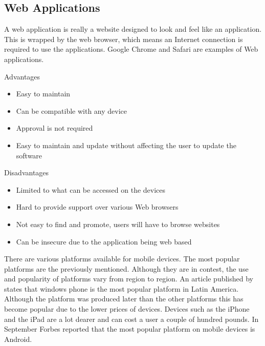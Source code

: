 \subsection{Web Applications}

A web application is really a website designed to look and feel like an 
application. This is wrapped by the web browser, which means an Internet
connection is required to use the applications. Google Chrome and Safari are 
examples of Web applications.

Advantages

\begin{itemize}
  \item Easy to maintain
  \item Can be compatible with any device
  \item Approval is not required
  \item Easy to maintain and update without affecting the user to update the
  software
\end{itemize}

Disadvantages

\begin{itemize}
  \item Limited to what can be accessed on the devices
  \item Hard to provide support over various Web browsers
  \item Not easy to find and promote, users will have to browse websites
  \item Can be insecure due to the application being web based
\end{itemize}

There are various platforms available for mobile devices. The most popular
platforms are the previously mentioned. Although they are in contest, the use
and popularity of platforms vary from region to region. An article published by
\citet{wpcentral13} states that windows phone is the most popular platform in
Latin America. Although the platform was produced later than the other platforms
this has become popular due to the lower prices of devices. Devices such as the
iPhone and the iPad are a lot dearer and can cost a user a couple of hundred
pounds. In September Forbes reported that the most popular platform on mobile
devices is Android.

